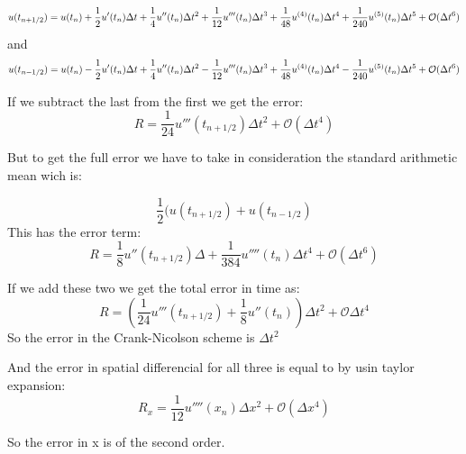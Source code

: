\documentclass[a4paper,10pt]{article}
\begin{document}
\begin{equation}
u(t_{n+1/2}) = u(t_n) + \frac{1}{2} u'(t_n)\Delta t + \frac{1}{4} u''(t_n) \Delta t^2 + \\
\frac{1}{12}u'''(t_n) \Delta t^3 + \frac{1}{48} u^{(4)}(t_n)\Delta t^4 + \\
\frac{1}{240} u^{(5)} (t_n) \Delta t^5 + \mathcal{O}(\Delta t^6)
\end{equation}
and
\begin{equation}
 u(t_{n-1/2}) = u(t_n) - \frac{1}{2} u'(t_n)\Delta t + \frac{1}{4} u''(t_n) \Delta t^2 - \\
\frac{1}{12}u'''(t_n) \Delta t^3 + \frac{1}{48} u^{(4)}(t_n)\Delta t^4 - \\
\frac{1}{240} u^{(5)} (t_n) \Delta t^5 + \mathcal{O}(\Delta t^6)
\end{equation}

If we subtract the last from the first we get the error:
\begin{equation}
 R = \frac{1}{24}u'''(t_{n+1/2})\Delta t^2 + \mathcal{O}(\Delta t^4)
\end{equation}

But to get the full error we have to take in consideration the standard arithmetic mean wich is:

\begin{equation}
 \frac{1}{2}(u(t_{n+1/2}) + u(t_{n - 1/2}) 
\end{equation}
This has the error term:
\begin{equation}
 R = \frac{1}{8}u''(t_{n+1/2})\Delta + \frac{1}{384}u''''(t_n)\Delta t^4 + \mathcal{O}(\Delta t^6)
\end{equation}

If we add these two we get the total error in time as:
\begin{equation}
 R = (\frac{1}{24} u'''(t_{n+1/2}) + \frac{1}{8}u''(t_n)) \Delta t^2 + \mathcal{O}\Delta t^4 
\end{equation}
So the error in the Crank-Nicolson scheme is $\Delta t^2$

And the error in spatial differencial for all three is equal to by usin taylor expansion:
\begin{equation}
 R_x = \frac{1}{12}u''''(x_n) \Delta x^2 + \mathcal{O}(\Delta x^4)
\end{equation}

So the error in x is of the second order.
\end{document}
